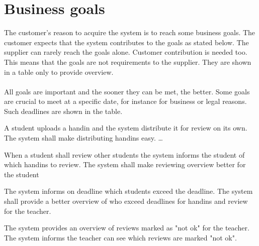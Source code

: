 \documentclass[Main]{subfiles}
\begin{document}
\section{Business goals}
The customer's reason to acquire the system is to reach some business goals. 
The customer expects that the system contributes to the goals as stated below. 
The supplier can rarely reach the goals alone. Customer contribution is needed too. 
This means that the goals are not requirements to the supplier. 
They are shown in a table only to provide overview. 
\\
\\
All goals are important and the sooner they can be met, the better. 
Some goals are crucial to meet at a specific date, for instance for business or legal reasons. 
Such deadlines are shown in the table.

\begin{GoalTable}

\Goal
{A student uploads a handin and the system distribute it for review on its own.}
{The system shall make distributing handins easy.}
{\dots}
{}

\Goal
{When a student shall review other students the system informs the student of which handins to review.}
{The system shall make reviewing overview better for the student}
{}
{}

\Goal
{The system informs on deadline which students exceed the deadline.}
{The system shall provide a better overview of who exceed deadlines for handins and review for the teacher.}
{}
{}

\Goal
{The system provides an overview of reviews marked as "not ok" for the teacher.}
{The system informs the teacher can see which reviews are marked "not ok".}
{}
{}

\end{GoalTable}
\end{document}
